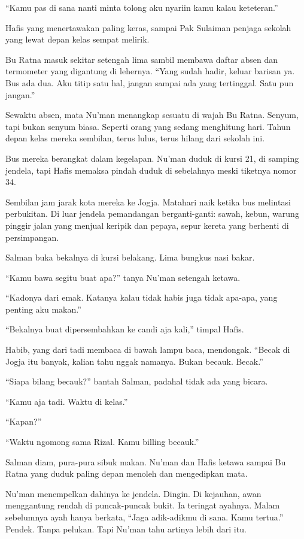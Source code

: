 ``Kamu pas di sana nanti minta tolong aku nyariin kamu kalau keteteran.''

Hafis yang menertawakan paling keras, sampai Pak Sulaiman penjaga sekolah yang lewat depan kelas sempat melirik.

Bu Ratna masuk sekitar setengah lima sambil membawa daftar absen dan termometer yang digantung di lehernya. ``Yang sudah hadir, keluar barisan ya. Bus ada dua. Aku titip satu hal, jangan sampai ada yang tertinggal. Satu pun jangan.''

Sewaktu absen, mata Nu'man menangkap sesuatu di wajah Bu Ratna. Senyum, tapi bukan senyum biasa. Seperti orang yang sedang menghitung hari. Tahun depan kelas mereka sembilan, terus lulus, terus hilang dari sekolah ini.

Bus mereka berangkat dalam kegelapan. Nu'man duduk di kursi 21, di samping jendela, tapi Hafis memaksa pindah duduk di sebelahnya meski tiketnya nomor 34.

Sembilan jam jarak kota mereka ke Jogja. Matahari naik ketika bus melintasi perbukitan. Di luar jendela pemandangan berganti-ganti: sawah, kebun, warung pinggir jalan yang menjual keripik dan pepaya, sepur kereta yang berhenti di persimpangan.

Salman buka bekalnya di kursi belakang. Lima bungkus nasi bakar.

``Kamu bawa segitu buat apa?'' tanya Nu'man setengah ketawa.

``Kadonya dari emak. Katanya kalau tidak habis juga tidak apa-apa, yang penting aku makan.''

``Bekalnya buat dipersembahkan ke candi aja kali,'' timpal Hafis.

Habib, yang dari tadi membaca di bawah lampu baca, mendongak. ``Becak di Jogja itu banyak, kalian tahu nggak namanya. Bukan becauk. Becak.''

``Siapa bilang becauk?'' bantah Salman, padahal tidak ada yang bicara.

``Kamu aja tadi. Waktu di kelas.''

``Kapan?''

``Waktu ngomong sama Rizal. Kamu billing becauk.''

Salman diam, pura-pura sibuk makan. Nu'man dan Hafis ketawa sampai Bu Ratna yang duduk paling depan menoleh dan mengedipkan mata.

Nu'man menempelkan dahinya ke jendela. Dingin. Di kejauhan, awan menggantung rendah di puncak-puncak bukit. Ia teringat ayahnya. Malam sebelumnya ayah hanya berkata, ``Jaga adik-adikmu di sana. Kamu tertua.'' Pendek. Tanpa pelukan. Tapi Nu'man tahu artinya lebih dari itu.

